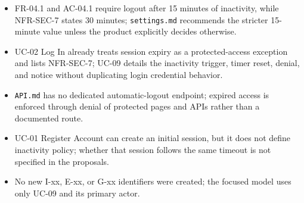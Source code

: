\documentclass[12pt]{article}
\begin{document}
\begin{itemize}
\item FR-04.1 and AC-04.1 require logout after 15 minutes of inactivity, while NFR-SEC-7 states 30 minutes; \texttt{settings.md} recommends the stricter 15-minute value unless the product explicitly decides otherwise.
\item UC-02 Log In already treats session expiry as a protected-access exception and lists NFR-SEC-7; UC-09 details the inactivity trigger, timer reset, denial, and notice without duplicating login credential behavior.
\item \texttt{API.md} has no dedicated automatic-logout endpoint; expired access is enforced through denial of protected pages and APIs rather than a documented route.
\item UC-01 Register Account can create an initial session, but it does not define inactivity policy; whether that session follows the same timeout is not specified in the proposals.
\item No new I-xx, E-xx, or G-xx identifiers were created; the focused model uses only UC-09 and its primary actor.
\end{itemize}
\par\medskip
\end{document}
